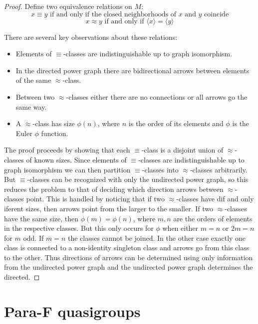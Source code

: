 \documentclass[12pt, twoside, openright]{report}
\theoremstyle{definition}
\begin{document}
\begin{proof}
  Define two equivalence relations on $M$:
    \[x\equiv y\text{ if and only if the closed neighborhoods of $x$ and $y$ coincide}\]
    \[x\approx y\text{ if and only if }\langle x\rangle = \langle y\rangle\]

  There are several key observations about these relations:
  \begin{itemize}
    \item Elements of $\equiv$-classes are indistinguishable up to graph isomorphism.
    \item In the directed power graph there are bidirectional arrows between elements of
      the same $\approx$-class.
    \item Between two $\approx$-classes either there are no connections or all arrows go the same way.
    \item A $\approx$-class has size $\phi(n)$, where $n$ is the order of its elements and $\phi$
      is the Euler $\phi$ function.
  \end{itemize}
  The proof proceeds by showing that each $\equiv$-class is a disjoint union of $\approx$-classes
    of known sizes. Since elements of $\equiv$-classes are indistinguishable up to graph isomorphism
    we can then partition $\equiv$-classes into $\approx$-classes arbitrarily. But $\equiv$-classes
    can be recognized with only the undirected power graph, so this reduces the problem to that of
    deciding which direction arrows between $\approx$-classes point. This is handled by noticing that
    if two $\approx$-classes have dif and only iferent sizes, then arrows point from the larger to the smaller.
    If two $\approx$-classes have the same size, then $\phi(m) = \phi(n)$, where $m, n$ are the orders
    of elements in the respective classes. But this only occurs for $\phi$ when either $m = n$ or
    $2m = n$ for $m$ odd. If $m = n$ the classes cannot be joined. In the other case exactly one class
    is connected to a non-identity singleton class and arrows go from this class to the other. Thus
    directions of arrows can be determined using only information from the undirected power graph and
    the undirected power graph determines the directed.
\end{proof}


\chapter{Para-F quasigroups}
\end{document}
